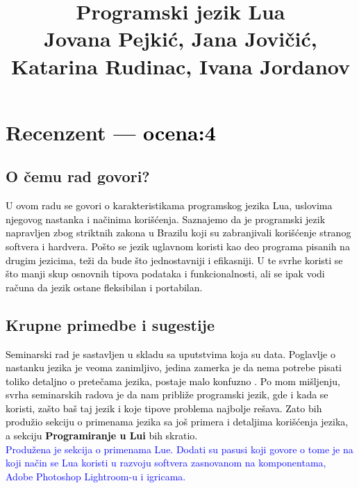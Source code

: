\documentclass[a4paper]{report}
\newcommand{\odgovor}[1]{\textcolor{black}{#1}}
\newcommand{\odgovorAutora}[1]{\textcolor{blue}{#1}}
\newcommand{\note}[1]{\textcolor{red}{#1}}
\begin{document}
\title{Programski jezik Lua\\ \small{Jovana Pejkić, Jana Jovičić, Katarina Rudinac, Ivana Jordanov}}

\maketitle

\tableofcontents

\chapter{Recenzent \odgovor{--- ocena:4} }


\section{O čemu rad govori?}
\odgovor{
U ovom radu se govori o karakteristikama programskog jezika Lua, uslovima njegovog nastanka i načinima korišćenja. Saznajemo da je programski jezik napravljen zbog striktnih zakona u Brazilu koji su zabranjivali korišćenje stranog softvera i hardvera. Pošto se jezik uglavnom koristi kao deo programa pisanih na drugim jezicima, teži da bude što jednostavniji i efikasniji. U te svrhe koristi se što manji skup osnovnih tipova podataka i funkcionalnosti, ali se ipak vodi računa da jezik ostane fleksibilan i portabilan. 
}

\section{Krupne primedbe i sugestije}
\odgovor{
Seminarski rad je sastavljen u skladu sa uputstvima koja su data. Poglavlje o nastanku jezika je veoma zanimljivo, jedina zamerka je da nema potrebe pisati toliko detaljno o pretečama jezika, postaje malo konfuzno .\newline
Po mom mišljenju, svrha seminarskih radova je da nam približe programski jezik, gde i kada se koristi, zašto baš taj jezik i koje tipove problema najbolje rešava. Zato bih produžio sekciju o primenama jezika sa još primera i detaljima korišćenja jezika, a sekciju 
\textbf{Programiranje u Lui} bih skratio.\\
\odgovorAutora{Produžena je sekcija o primenama Lue. Dodati su pasusi koji govore o tome je na koji način se Lua koristi u razvoju softvera zasnovanom na komponentama, Adobe Photoshop Lightroom-u i igricama.} 
}
\end{document}
